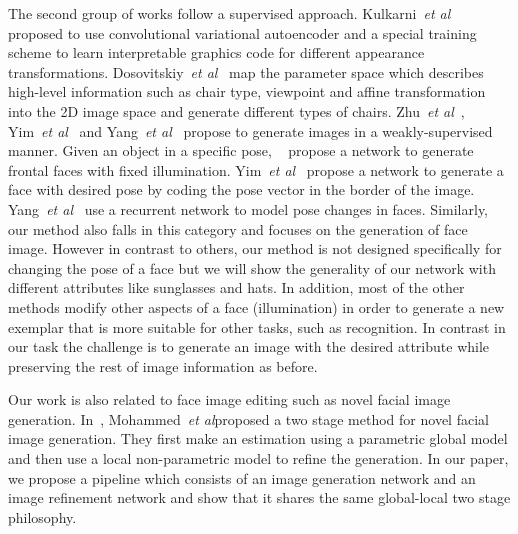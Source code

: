 \documentclass[10pt,twocolumn,letterpaper]{article}
\def\etal{\emph{et al}\onedot}
\begin{document}
The second group of works follow a supervised approach.
Kulkarni~\etal~\cite{Kulkarni-nips15} proposed to use convolutional variational autoencoder and a special training scheme to learn interpretable graphics code for different appearance transformations.
Dosovitskiy~\etal~\cite{Dosovitskiy-cvpr15} map the parameter space which describes high-level information 
such as chair type, viewpoint and affine transformation into the 2D image space and generate different types of chairs.
Zhu~\etal~\cite{zhu2013deep,zhu-nips14}, Yim~\etal~\cite{Yim-cvpr15} and Yang~\etal~\cite{Yang-nips15} 
propose to generate images in a weakly-supervised manner.
Given an object in a specific pose, ~\cite{zhu2013deep} propose a network to generate frontal faces with fixed illumination. 
Yim~\etal~\cite{Yim-cvpr15} propose a network to generate a face with desired pose by coding the pose vector in the border of the image.
Yang~\etal~\cite{Yang-nips15} use a recurrent network to model pose changes in faces. 
Similarly, our method also falls in this category and focuses on the generation of face image. However in contrast to others, our method is not designed specifically for changing the pose of a face but we will show the generality of our network with different attributes like sunglasses and hats. In addition, most of the other methods modify other aspects of a face (\eg illumination) in order to generate a new exemplar that is more suitable for other tasks, such as recognition. In contrast in our task the challenge is to generate an image with the desired attribute while preserving the rest of image information as before.

Our work is also related to face image editing such as novel facial image generation.
In~\cite{Mohammed-siggraph09}, Mohammed~\etal proposed a two stage method for novel facial image generation.
They first make an estimation using a parametric global model and then use a local non-parametric model to refine the generation.
In our paper, we propose a pipeline which consists of an image generation network and an image refinement network
and show that it shares the same global-local two stage philosophy.



\vspace{-1mm}
\end{document}
